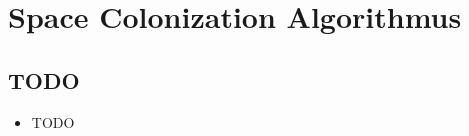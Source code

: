 \newpage
\slidetitle{}
\section{Space Colonization Algorithmus}
\subsection{TODO}

\begin{center}
\end{center}

\newpage
{}

\begin{itemize}
\item TODO \\

\end{itemize}

